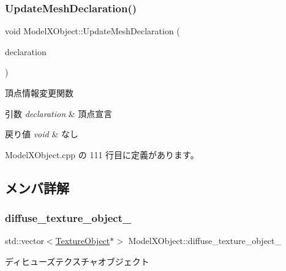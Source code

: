 \subsubsection{\texorpdfstring{Update\+Mesh\+Declaration()}{UpdateMeshDeclaration()}}
{\footnotesize\ttfamily void Model\+X\+Object\+::\+Update\+Mesh\+Declaration (\begin{DoxyParamCaption}\item[{const D3\+D\+V\+E\+R\+T\+E\+X\+E\+L\+E\+M\+E\+N\+T9 $\ast$}]{declaration }\end{DoxyParamCaption})}



頂点情報変更関数 


\begin{DoxyParams}{引数}
{\em declaration} & 頂点宣言 \\
\hline
\end{DoxyParams}

\begin{DoxyRetVals}{戻り値}
{\em void} & なし \\
\hline
\end{DoxyRetVals}


 Model\+X\+Object.\+cpp の 111 行目に定義があります。



\subsection{メンバ詳解}
\mbox{\label{class_model_x_object_a1d85909d707f74358802402259c02abc}} 
\subsubsection{\texorpdfstring{diffuse\+\_\+texture\+\_\+object\+\_\+}{diffuse\_texture\_object\_}}
{\footnotesize\ttfamily std\+::vector$<$\mbox{\hyperlink{class_texture_object}{Texture\+Object}}$\ast$$>$ Model\+X\+Object\+::diffuse\+\_\+texture\+\_\+object\+\_\+\hspace{0.3cm}{\ttfamily [private]}}



ディヒューズテクスチャオブジェクト 



